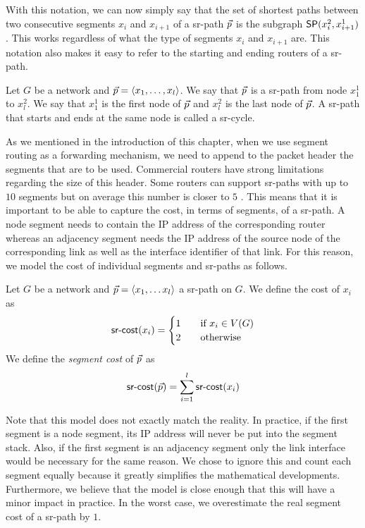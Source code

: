 With this notation, we can now simply say that the set of shortest paths between two consecutive segments $x_i$ and $x_{i + 1}$
of a sr-path $\sr{p}$ is the subgraph $\sp(x^2_i, x^1_{i + 1})$. This works regardless of what the type of segments $x_i$ and $x_{i + 1}$
are. This notation also makes it easy to refer to the starting and ending routers of a sr-path.

\begin{definition}
Let $G$ be a network and $\sr{p} = \langle x_1, \ldots, x_l \rangle$. We say that $\sr{p}$ is a sr-path from node $x^1_1$ to
$x^2_l$. We say that $x^1_1$ is the first node of $\sr{p}$ and $x^2_l$ is the last node of $\sr{p}$. A sr-path that
starts and ends at the same node is called a sr-cycle.
\end{definition}

As we mentioned in the introduction of this chapter, when we use segment routing as a forwarding mechanism, we need to append to the packet 
header the segments that are to be used. Commercial routers have strong limitations regarding the size of this header. Some routers can
support sr-paths with up to $10$ segments but on average this number is closer to $5$ \cite{Tantsura_SID:2017}.
This means that it is important to be able to capture the cost, in terms of segments, of a sr-path. A node segment needs to contain
the IP address of the corresponding router whereas an adjacency segment needs the IP address of the source node of the corresponding link
as well as the interface identifier of that link. For this reason, we model the cost of individual segments and sr-paths as follows.

\begin{definition}
Let $G$ be a network and $\sr{p} = \langle x_1, \ldots x_l \rangle$ a sr-path on $G$. We define the cost of $x_i$ as
\[ \cost(x_i) =
  \begin{cases}
    1 & \quad \text{if } x_{i} \in V(G) \\
    2 & \quad \text{otherwise}
  \end{cases}
\]
We define the \emph{segment cost} of $\sr{p}$ as
$$
\cost(\sr{p}) = \sum_{i = 1}^l \cost(x_i)
$$
\end{definition}

Note that this model does not exactly match the reality. In practice, if the first segment is a node segment, its IP address will never be put into the
segment stack. Also, if the first segment is an adjacency segment only the link interface would be necessary
for the same reason. We chose to ignore this and count each segment equally because it greatly simplifies the mathematical developments. Furthermore, we
believe that the model is close enough that this will have a minor impact in practice. In the worst case, we overestimate the real segment cost
of a sr-path by $1$.

